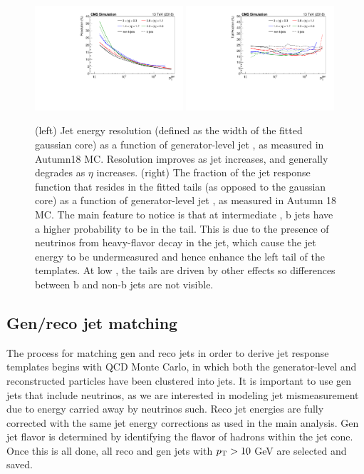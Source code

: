 \begin{figure}[htbp]
  \begin{center}
    \includegraphics[width=0.49\textwidth]{figs/jetmet/resolution_vs_pt.pdf}
    \includegraphics[width=0.49\textwidth]{figs/jetmet/tailfrac_vs_pt.pdf}
    \caption{(left) Jet energy resolution (defined as the width of the fitted gaussian core) as a function of generator-level jet \pt, as measured in Autumn18 MC. 
    Resolution improves as jet \pt increases, and generally degrades as $\eta$ increases.
    (right) The fraction of the jet response function that resides in the fitted tails (as opposed to the gaussian core) as a function of generator-level jet \pt, 
    as measured in Autumn 18 MC. The main feature to notice is that at intermediate \pt,  b jets have a higher probability to be in the tail. This is due to the presence
    of neutrinos from heavy-flavor decay in the jet, which cause the jet energy to be undermeasured and hence enhance the left tail of the templates. At low \pt, the
    tails are driven by other effects so differences between b and non-b jets are not visible.
    }
    \label{fig:jrt_res_pt}
  \end{center}
\end{figure}


\subsection{Gen/reco jet matching}
\label{sec:jrt_matching}

The process for matching gen and reco jets in order to derive jet response templates begins with QCD Monte Carlo,
in which both the generator-level and reconstructed particles have been clustered into jets.
It is important to use gen jets that include neutrinos, as we are interested in modeling jet mismeasurement due
to energy carried away by neutrinos such. Reco jet energies are fully corrected with the same jet energy corrections
as used in the main analysis. Gen jet flavor is determined by identifying the flavor of 
hadrons within the jet cone. Once this is all done, all reco and gen jets with $p_{\mathrm{T}}>10$ GeV are selected and saved.


